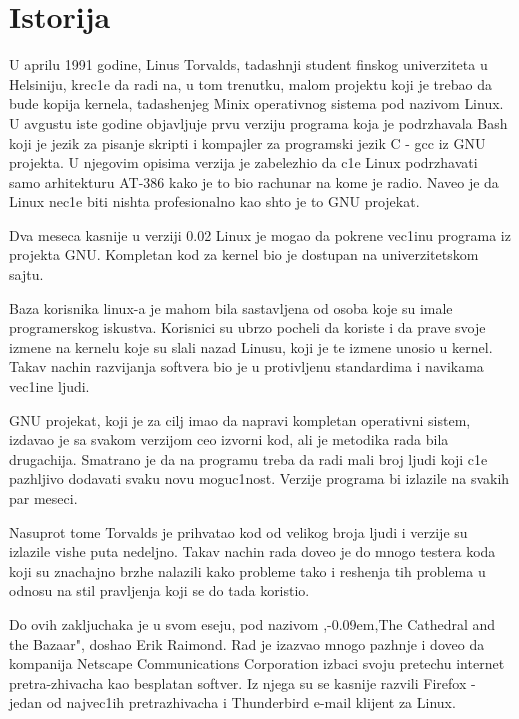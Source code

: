 \documentclass[a4paper,fleqn,12pt]{JMThesis}
\newcommand{\latin}{\fontencoding{T1}\selectfont}
\theoremstyle{plain}
\theoremstyle{definition}
\def\zn{,\kern-0.09em,}
\begin{document}
\section[Istorija]{Istorija}
\medskip

U aprilu 1991 godine, {\latin Linus Torvalds}, tadashnji student finskog univerziteta u Helsiniju, krec1e da radi na, u tom trenutku, malom projektu koji je trebao da bude kopija kernela, tadashenjeg {\latin Minix} operativnog sistema pod nazivom {\latin Linux}.
U avgustu iste godine objavljuje prvu verziju programa koja je podrzhavala {\latin Bash} koji je jezik za pisanje skripti i kompajler za programski jezik {\latin C} - {\latin gcc} iz {\latin GNU} projekta.
U njegovim opisima verzija je zabelezhio da c1e {\latin Linux} podrzhavati samo arhitekturu AT-386 kako je to bio rachunar na kome je radio.
Naveo je da {\latin Linux} nec1e biti nishta profesionalno kao shto je to {\latin GNU} projekat. \par
Dva meseca kasnije u verziji 0.02 {\latin Linux} je mogao da pokrene vec1inu programa iz projekta {\latin GNU}.
Kompletan kod za kernel bio je dostupan na univerzitet\-skom sajtu.\par

Baza korisnika {\latin linux}-a je mahom bila sastavljena od osoba koje su imale programerskog iskustva.
Korisnici su ubrzo pocheli da koriste i da prave svoje izmene na kernelu koje su slali nazad Linusu, koji je te izmene unosio u kernel.
Takav nachin razvijanja softvera bio je u protivljenu standardima i navikama vec1ine ljudi. \par
{\latin GNU} projekat, koji je za cilj imao da napravi kompletan operativni sistem, izdavao je sa svakom verzijom ceo izvorni kod, ali je metodika rada bila drugachija. 
Smatrano je da na programu treba da radi mali broj ljudi koji c1e pazhljivo dodavati svaku novu moguc1nost.
Verzije programa bi izlazile na svakih par meseci. \par

Nasuprot tome Torvalds je prihvatao kod od velikog broja ljudi i verzije su izlazile vishe puta nedeljno. 
Takav nachin rada doveo je do mnogo testera koda koji su znachajno brzhe nalazili kako probleme tako i reshenja tih problema u odnosu na stil pravljenja koji se do tada koristio.\par
Do ovih zakljuchaka je u svom eseju, pod nazivom \zn {\latin The Cathedral and the Bazaar}", doshao Erik Raimond. 
Rad je izazvao mnogo pazhnje i doveo da kompanija {\latin  Netscape Communications Corporation} izbaci svoju pretechu internet pretra-zhivacha kao besplatan softver. Iz njega su se kasnije razvili {\latin Firefox} - jedan od najvec1ih pretrazhivacha i {\latin Thunderbird} e-mail klijent za {\latin Linux}.
\end{document}

